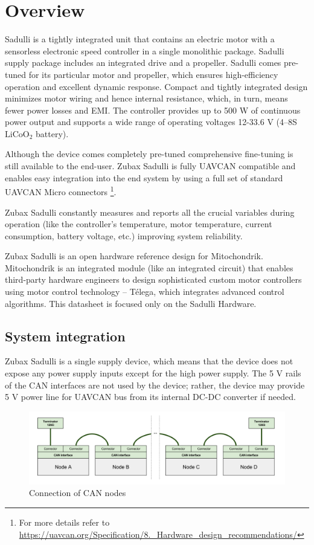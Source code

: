 \chapter{Overview}

Sadulli is a tightly integrated unit that contains an electric motor with a sensorless electronic speed controller 
in a single monolithic package. Sadulli supply package includes an integrated drive and a propeller. 
Sadulli comes pre-tuned for its particular motor and propeller, 
which ensures high-efficiency operation and excellent dynamic response. 
Compact and tightly integrated design minimizes motor wiring and hence internal resistance, which, in turn, 
means fewer power losses and EMI.
The controller provides up to 500 W of continuous power output and supports a wide range of operating voltages 
12-33.6 V (4–8S $\text{LiCoO}_\text{2}$ battery).

Although the device comes completely pre-tuned comprehensive fine-tuning is still available to the end-user.
Zubax Sadulli is fully UAVCAN compatible and enables easy integration into the end system by 
using a full set of standard UAVCAN Micro connectors
\footnote{For more details refer to \url{https://uavcan.org/Specification/8._Hardware_design_recommendations/}}.

Zubax Sadulli constantly measures and reports all the crucial variables during operation 
(like the controller’s temperature, motor temperature, current consumption, battery voltage, etc.) 
improving system reliability.

Zubax Sadulli is an open hardware reference design for Mitochondrik.
Mitochondrik is an integrated module (like an integrated circuit) that enables third-party hardware engineers 
to design sophisticated custom motor controllers using motor control technology – T\'elega, 
which integrates advanced control algorithms. This datasheet is focused only on the Sadulli Hardware.

\section{System integration}
Zubax Sadulli is a single supply device, which means that the device does not expose any power supply inputs 
except for the high power supply. The 5 V rails of the CAN interfaces are not used by the device; 
rather, the device may provide 5 V power line for UAVCAN bus from its internal DC-DC converter if needed.

\begin{figure}[h]
    \centering
    \includegraphics[width=1\textwidth]{figures/can_integration.png}
    \caption{Connection of CAN nodes}
\end{figure}

